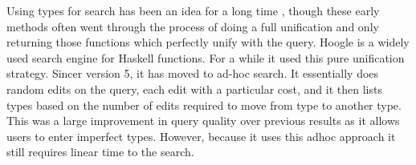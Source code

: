 Using types for search has been an idea for a long time \cite{ReusablePolyType,TypeAsKey},
though these early methods often went through the process of doing a full unification and only returning those functions which perfectly unify with the query.
Hoogle \cite{hoogle} is a widely used search engine for Haskell functions.
For a while it used this pure unification strategy.
Sincer version 5, it has moved to ad-hoc search.
It essentially does random edits on the query, each edit with a particular cost,
and it then lists types based on the number of edits required to move from type to another type.
This was a large improvement in query quality over previous results as it allows users to enter imperfect types.
However, because it uses this adhoc approach it still requires linear time to the search.